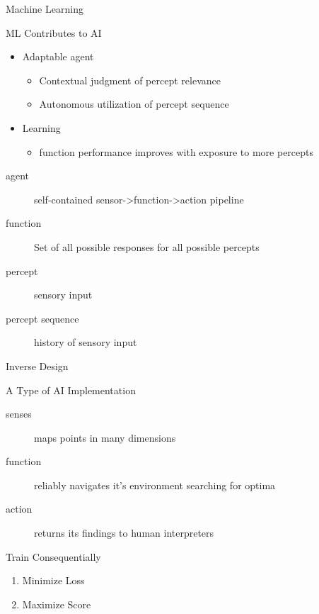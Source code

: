 \documentclass[10pt, compress]{beamer}
\begin{document}
\begin{frame}[label={sec:org5f52d2c}]{Machine Learning}
\begin{block}{ML Contributes to AI}
\begin{itemize}
\item Adaptable \alert{agent}
\begin{itemize}
\item Contextual judgment of \alert{percept} relevance
\item Autonomous utilization of \alert{percept sequence}
\end{itemize}
\item Learning
\begin{itemize}
\item \alert{function} performance improves with exposure to more percepts
\end{itemize}
\end{itemize}
\end{block}
\begin{definition}
\begin{description}
\item[{agent}] self-contained sensor->function->action pipeline
\item[{function}] Set of all possible responses for all possible percepts
\item[{percept}] sensory input
\item[{percept sequence}] history of sensory input
\end{description}
\end{definition}
\end{frame}
\begin{frame}[label={sec:orgb72da13}]{Inverse Design}
\begin{block}{A Type of AI Implementation}
\begin{description}
\item[{senses}] maps points in many dimensions
\item[{function}] reliably navigates it's environment searching for optima
\item[{action}] returns its findings to human interpreters
\end{description}
\end{block}
\begin{block}{Train Consequentially}
\begin{enumerate}
\item Minimize Loss
\item Maximize Score
\end{enumerate}
\end{block}
\end{frame}
\end{document}
